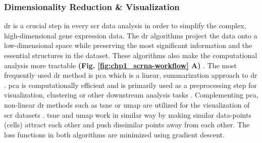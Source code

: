 \subsubsection{Dimensionality Reduction \& Visualization}
\gls{dr} is a crucial step in every \gls{scr} data analysis in order to simplify the complex, high-dimensional gene expression data. The \gls{dr} algorithms project the data onto a low-dimensional space while preserving the most significant information and the essential structures in the dataset. These algorithms also make the computational analysis more tractable \textbf{(Fig. \ref{fig:chp1_scrna-workflow} A)} \textbf{\cite{lueckenmalte_d_current_2019}}. 
The most frequently used \gls{dr} method is \gls{pca} \textbf{\cite{pearson_lines_1901}} which is a linear, summarization approach to \gls{dr} \textbf{\cite{lueckenmalte_d_current_2019,heumos_best_2023}}. 
\gls{pca} is computationally efficient and is primarily used as a preprocessing step for visualization, clustering or other downstream analysis tasks \textbf{\cite{lueckenmalte_d_current_2019}}. Complementing \gls{pca}, non-linear \gls{dr} methods such as \gls{tsne} \textbf{\cite{maaten_visualizing_2008}} or \gls{umap} \textbf{\cite{mcinnes_umap_2018}} are utilized for the visualization of \gls{scr} datasets \textbf{\cite{lueckenmalte_d_current_2019,heumos_best_2023}}. \gls{tsne} and \gls{umap} work in similar way by making similar data-points (cells) attract each other and push dissimilar points away from each other. The loss functions in both algorithms are minimized using gradient descent. 
